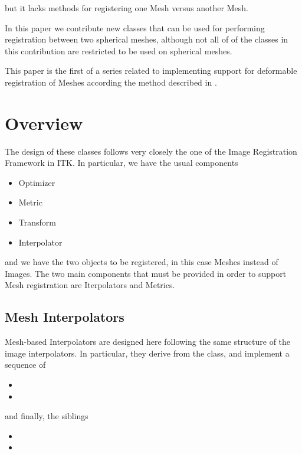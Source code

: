 \documentclass{InsightArticle}
\begin{document}
but it lacks methods for registering one Mesh versus another Mesh.

In this paper we contribute new classes that can be used for performing
registration between two spherical meshes, although not all of of the classes
in this contribution are restricted to be used on spherical meshes.

This paper is the first of a series related to implementing support for
deformable registration of Meshes according the method described in \cite{Yeo2008}.

\section{Overview}

The design of these classes follows very closely the one of the Image
Registration Framework in ITK.  In particular, we have the usual components

\begin{itemize}
\item Optimizer
\item Metric
\item Transform
\item Interpolator
\end{itemize}

and we have the two objects to be registered, in this case Meshes instead of
Images. The two main components that must be provided in order to support Mesh
registration are Iterpolators and Metrics.

\subsection{Mesh Interpolators}

Mesh-based Interpolators are designed here following the same structure of the
image interpolators. In particular, they derive from the 
class, and implement a sequence of 

\begin{itemize}
\item {}
\item {}
\end{itemize}

 and finally, the siblings

\begin{itemize}
\item {}
\item {}
\end{itemize}
\end{document}
